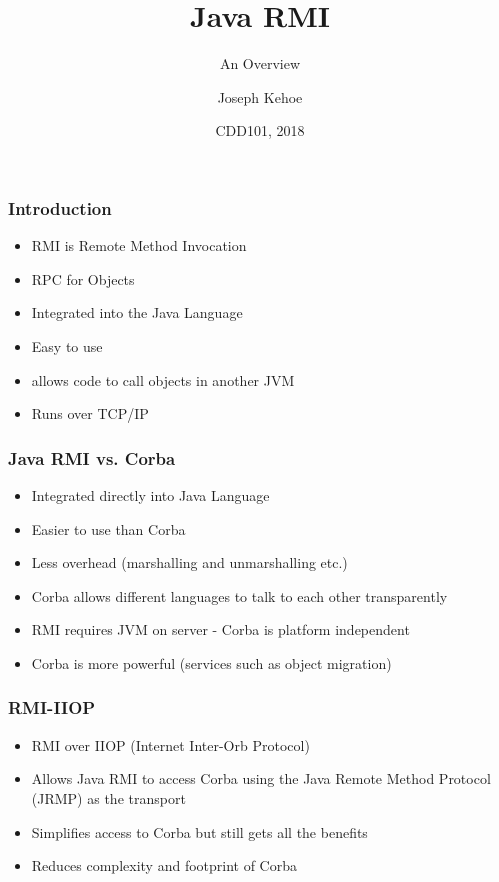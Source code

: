 \documentclass{beamer}
\title[Java RMI] %
{Java RMI}
\subtitle{An Overview}
\author[Dr. Joseph Kehoe] %
{Joseph Kehoe\inst{1}}
\institute[IT Carlow] %
{
	\inst{1}%
	Department of Computing and Networking\\
	Institute of Technology Carlow
}
\date[ITC 2018] %
{CDD101, 2018}
\begin{document}
 
\frame{\titlepage}
 
 


  \begin{frame}
  	\frametitle{Introduction}

  	\begin{itemize}
  		\item RMI is Remote Method Invocation
  		\item RPC for Objects
  		\item Integrated into the Java Language
  		\item Easy to use
  		\item allows code to call objects in another JVM
  		\item Runs over TCP/IP
  	\end{itemize}
  \end{frame}
  
    \begin{frame}
    	\frametitle{Java RMI vs. Corba}
    	\begin{itemize}
    		\item Integrated directly into Java Language
    		\item Easier to use than Corba
    		\item Less overhead (marshalling and unmarshalling etc.)
    		\item Corba allows different languages to talk to each other transparently
    		\item RMI requires JVM on server - Corba is platform independent
    		\item Corba is more powerful (services such as object migration)
    	\end{itemize}
    \end{frame}
 
 
     \begin{frame}
     	\frametitle{RMI-IIOP}
     	\begin{itemize}
     		\item RMI over IIOP (Internet Inter-Orb Protocol)
     		\item Allows Java RMI to access Corba using the Java Remote Method Protocol (JRMP) as the transport	
     		\item Simplifies access to Corba but still gets all the benefits
     		\item Reduces complexity and footprint of Corba
     	\end{itemize}

     \end{frame}
     
\end{document}
